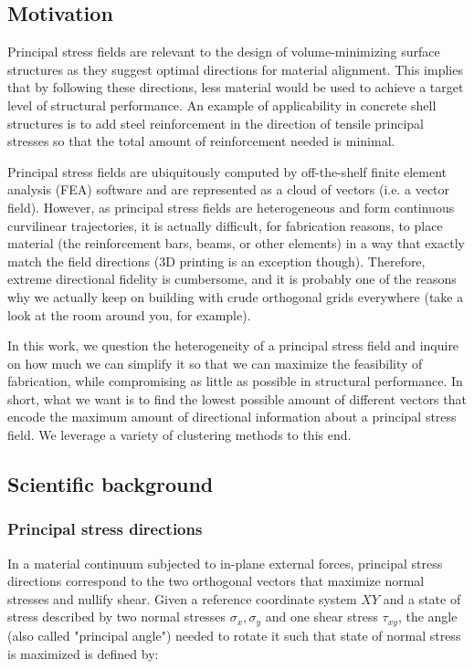 \documentclass[11pt]{article}
\begin{document}
\subsection{Motivation}

Principal stress fields are relevant to the design of volume-minimizing surface structures as they suggest optimal directions for material alignment. This implies that by following these directions, less material would be used to achieve a target level of structural performance. An example of applicability in concrete shell structures is to add steel reinforcement in the direction of tensile principal stresses so that the total amount of reinforcement needed is minimal.

Principal stress fields are ubiquitously computed by off-the-shelf finite element analysis (FEA) software and are represented as a cloud of vectors (i.e. a vector field). However, as principal stress fields are heterogeneous and form continuous curvilinear trajectories, it is actually difficult, for fabrication reasons, to place material (the reinforcement bars, beams, or other elements) in a way that exactly match the field directions (3D printing is an exception though). Therefore, extreme directional fidelity is cumbersome, and it is probably one of the reasons why we actually keep on building with crude orthogonal grids everywhere (take a look at the room around you, for example).

In this work, we question the heterogeneity of a principal stress field and inquire on how much we can simplify it so that we can maximize the feasibility of fabrication, while compromising as little as possible in structural performance. In short, what we want is to find the lowest possible amount of different vectors that encode the maximum amount of directional information about a principal stress field. We leverage a variety of clustering methods to this end.


\subsection{Scientific background}

\subsubsection{Principal stress directions}

In a material continuum subjected to in-plane external forces, principal stress directions correspond to the two orthogonal vectors that maximize normal stresses and nullify shear. Given a reference coordinate system $XY$ and a state of stress described by two normal stresses $\sigma_x, \sigma_y$ and one shear stress $\tau_{xy}$, the angle (also called "principal angle") needed to rotate it such that state of normal stress is maximized is defined by:
\end{document}
